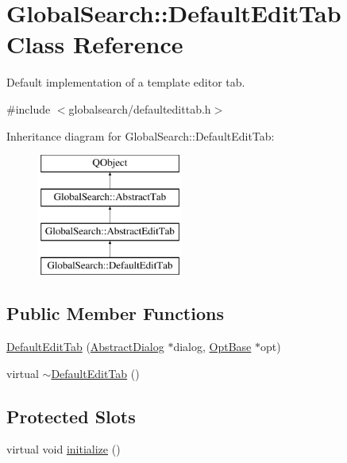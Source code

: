\hypertarget{classGlobalSearch_1_1DefaultEditTab}{\section{Global\-Search\-:\-:Default\-Edit\-Tab Class Reference}
\label{classGlobalSearch_1_1DefaultEditTab}
}


Default implementation of a template editor tab.  




{\ttfamily \#include $<$globalsearch/defaultedittab.\-h$>$}

Inheritance diagram for Global\-Search\-:\-:Default\-Edit\-Tab\-:\begin{figure}[H]
\begin{center}
\leavevmode
\includegraphics[height=4.000000cm]{classGlobalSearch_1_1DefaultEditTab}
\end{center}
\end{figure}
\subsection*{Public Member Functions}
\begin{DoxyCompactItemize}
\item 
\hyperlink{classGlobalSearch_1_1DefaultEditTab_ae511483de60e194bcf2e82e931da541d}{Default\-Edit\-Tab} (\hyperlink{classGlobalSearch_1_1AbstractDialog}{Abstract\-Dialog} $\ast$dialog, \hyperlink{classGlobalSearch_1_1OptBase}{Opt\-Base} $\ast$opt)
\item 
virtual \hyperlink{classGlobalSearch_1_1DefaultEditTab_ab2b458010ec73753f0e00b568af00d0b}{$\sim$\-Default\-Edit\-Tab} ()
\end{DoxyCompactItemize}
\subsection*{Protected Slots}
\begin{DoxyCompactItemize}
\item 
virtual void \hyperlink{classGlobalSearch_1_1DefaultEditTab_aabb8111d57852154b366640b728baabb}{initialize} ()
\end{DoxyCompactItemize}
